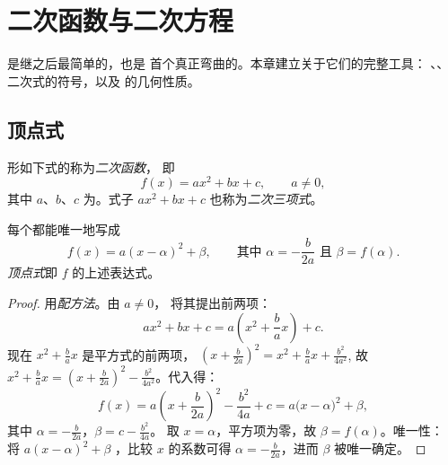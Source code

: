 \chapter{二次函数与二次方程}\label{ch:g11:quad}

是继之后最简单的，也是
首个真正弯曲的。本章建立关于它们的完整工具：
、、二次式的符号，以及
的几何性质。

\section{顶点式}

\begin{definition}[二次函数]\label{def:g11:quad:quadratic}
形如下式的称为\emph{二次函数}，
即
\[
f(x) = ax^2 + bx + c, \qquad a \neq 0,
\]
其中 $a$、$b$、$c$ 为。式子 $ax^2 + bx + c$
也称为\emph{二次三项式}。
\end{definition}

\begin{theorem}[顶点式]\label{thm:g11:quad:canonical}
每个都能唯一地写成
\[
f(x) = a(x - \alpha)^2 + \beta,
\qquad\text{其中 } \alpha = -\frac{b}{2a} \text{ 且 } \beta = f(\alpha).
\]
\emph{顶点式}即 $f$ 的上述表达式。
\end{theorem}

\begin{proof}
用\emph{配方法}。由 $a \neq 0$，
将其提出前两项：
\[
ax^2 + bx + c = a\left(x^2 + \frac{b}{a}x\right) + c .
\]
现在 $x^2 + \frac{b}{a}x$ 是平方式的前两项，
$\left(x + \frac{b}{2a}\right)^2 = x^2 + \frac ba x + \frac{b^2}{4a^2}$,
故 $x^2 + \frac{b}{a}x = \left(x + \frac{b}{2a}\right)^2 -
\frac{b^2}{4a^2}$。代入得：
\[
f(x) = a\left(x + \frac{b}{2a}\right)^2 - \frac{b^2}{4a} + c
= a\bigl(x - \alpha\bigr)^2 + \beta,
\]
其中 $\alpha = -\frac{b}{2a}$，$\beta = c - \frac{b^2}{4a}$。
取 $x = \alpha$，平方项为零，故 $\beta = f(\alpha)$。唯一性：
将 $a(x-\alpha)^2 + \beta$ ，比较
$x$ 的系数可得 $\alpha = -\frac{b}{2a}$，进而 $\beta$ 被唯一确定。
\end{proof}

